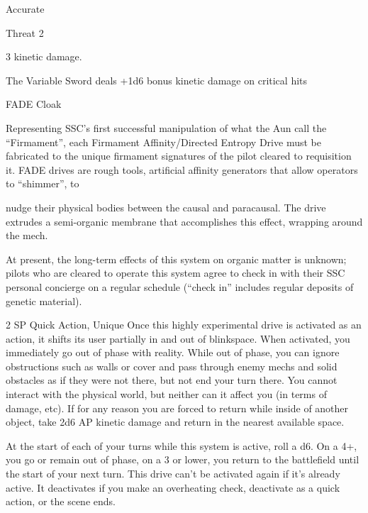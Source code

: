 Accurate

Threat 2

3 kinetic damage.

The Variable Sword deals +1d6 bonus kinetic damage on critical hits


FADE Cloak




Representing SSC’s first successful manipulation of what the Aun call the “Firmament”, each Firmament
Affinity/Directed Entropy Drive must be fabricated to the unique firmament signatures of the pilot cleared to
requisition it. FADE drives are rough tools, artificial affinity generators that allow operators to “shimmer”, to

nudge their physical bodies between the causal and paracausal. The drive extrudes a semi-organic
membrane that accomplishes this effect, wrapping around the mech.

At present, the long-term effects of this system on organic matter is unknown; pilots who are cleared to
operate this system agree to check in with their SSC personal concierge on a regular schedule (“check in”
includes regular deposits of genetic material).

2 SP
Quick Action, Unique
Once this highly experimental drive is activated as an action, it shifts its user partially in and out
of blinkspace. When activated, you immediately go out of phase with reality. While out of phase,
you can ignore obstructions such as walls or cover and pass through enemy mechs and solid
obstacles as if they were not there, but not end your turn there. You cannot interact with the
physical world, but neither can it affect you (in terms of damage, etc). If for any reason you are
forced to return while inside of another object, take 2d6 AP kinetic damage and return in the
nearest available space.


At the start of each of your turns while this system is active, roll a d6. On a 4+, you go or remain
out of phase, on a 3 or lower, you return to the battlefield until the start of your next turn. This
drive can’t be activated again if it’s already active. It deactivates if you make an overheating
check, deactivate as a quick action, or the scene ends.

